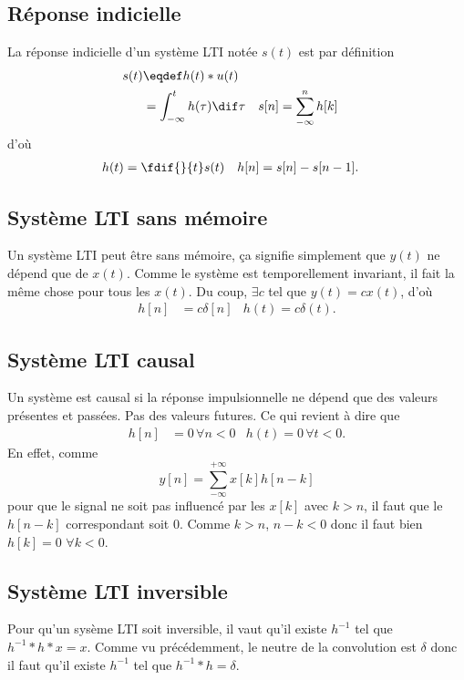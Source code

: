 \subsection{Réponse indicielle}
La réponse indicielle d'un système LTI notée $s(t)$ est par définition
\begin{align*}
  s(t) & \eqdef h(t) * u(t)\\
  & = \int_{-\infty}^t h(\tau) \dif \tau &
  s[n] & = \sum_{-\infty}^n h[k]
\end{align*}
d'où
\begin{align*}
  h(t) & = \fdif{}{t}s(t) & h[n] & = s[n] - s[n-1].
\end{align*}



\subsection{Système LTI sans mémoire}
Un système LTI peut être sans mémoire,
ça signifie simplement que $y(t)$ ne dépend que de $x(t)$.
Comme le système est temporellement invariant,
il fait la même chose pour tous les $x(t)$.
Du coup, $\exists c$ tel que $y(t) = cx(t)$, d'où
\begin{align*}
  h[n] & = c \delta[n] & h(t) = c \delta(t).
\end{align*}

\subsection{Système LTI causal}
Un système est causal si la réponse impulsionnelle ne dépend
que des valeurs présentes et passées.
Pas des valeurs futures.
Ce qui revient à dire que
\begin{align*}
  h[n] & = 0 \, \forall n < 0  & h(t) = 0 \, \forall t < 0.
\end{align*}
En effet, comme
\[ y[n] = \sum_{-\infty}^{+\infty}x[k]h[n-k] \]
pour que le signal ne soit pas influencé par les $x[k]$ avec
$k > n$, il faut que le $h[n-k]$ correspondant soit 0.
Comme $k > n$, $n - k < 0$ donc il faut bien $h[k] = 0$ $\forall k < 0$.

\subsection{Système LTI inversible}
Pour qu'un sysème LTI soit inversible, il vaut qu'il existe $h^{-1}$ tel que
$h^{-1}*h*x = x$.
Comme vu précédemment, le neutre de la convolution est $\delta$ donc il faut
qu'il existe $h^{-1}$ tel que $h^{-1} * h = \delta$.

